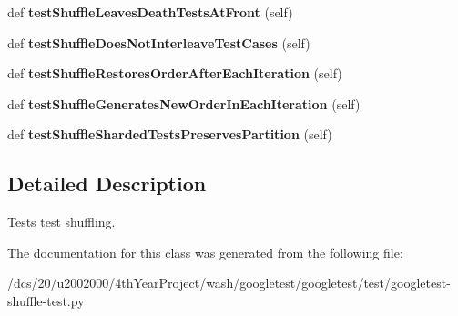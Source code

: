 \begin{DoxyCompactItemize}
def {\bfseries test\+Shuffle\+Leaves\+Death\+Tests\+At\+Front} (self)
\item 
\mbox{\label{classgoogletest-shuffle-test_1_1GTestShuffleUnitTest_a837b80b2c328cf030812d67b5d977b45}} 
def {\bfseries test\+Shuffle\+Does\+Not\+Interleave\+Test\+Cases} (self)
\item 
\mbox{\label{classgoogletest-shuffle-test_1_1GTestShuffleUnitTest_a04c8c704394572758647c8133e51e445}} 
def {\bfseries test\+Shuffle\+Restores\+Order\+After\+Each\+Iteration} (self)
\item 
\mbox{\label{classgoogletest-shuffle-test_1_1GTestShuffleUnitTest_ab87139a0521f324af16b086190a80601}} 
def {\bfseries test\+Shuffle\+Generates\+New\+Order\+In\+Each\+Iteration} (self)
\item 
\mbox{\label{classgoogletest-shuffle-test_1_1GTestShuffleUnitTest_a9e21814173c0822718d74c79c10e3b21}} 
def {\bfseries test\+Shuffle\+Sharded\+Tests\+Preserves\+Partition} (self)
\end{DoxyCompactItemize}


\subsection{Detailed Description}
\begin{DoxyVerb}Tests test shuffling.\end{DoxyVerb}
 

The documentation for this class was generated from the following file\+:\begin{DoxyCompactItemize}
\item 
/dcs/20/u2002000/4th\+Year\+Project/wash/googletest/googletest/test/googletest-\/shuffle-\/test.\+py\end{DoxyCompactItemize}
